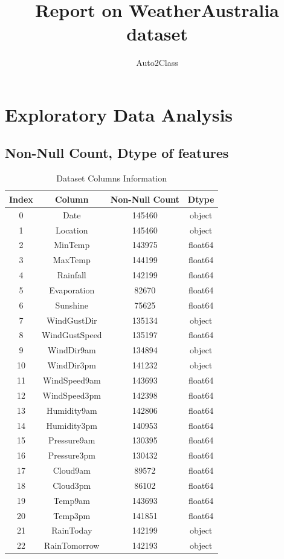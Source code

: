 \documentclass{article}%
\title{Report on WeatherAustralia dataset}%
\author{Auto2Class}%
\begin{document}
%
\normalsize%
\maketitle%
\newpage%
\tableofcontents%
\newpage%
\section{Exploratory Data Analysis}%
\label{sec:ExploratoryDataAnalysis}%
\subsection{Non{-}Null Count, Dtype of features}%
\label{subsec:Non{-}NullCount,Dtypeoffeatures}%


\begin{table}[h!]%
\caption{Dataset Columns Information}%
\vspace{0.2cm}%
\centering%
\begin{tabular}{|c||c||c||c|}%
\hline%
Index&Column&Non{-}Null Count&Dtype\\%
\hline%
0&Date&145460&object\\%
1&Location&145460&object\\%
2&MinTemp&143975&float64\\%
3&MaxTemp&144199&float64\\%
4&Rainfall&142199&float64\\%
5&Evaporation&82670&float64\\%
6&Sunshine&75625&float64\\%
7&WindGustDir&135134&object\\%
8&WindGustSpeed&135197&float64\\%
9&WindDir9am&134894&object\\%
10&WindDir3pm&141232&object\\%
11&WindSpeed9am&143693&float64\\%
12&WindSpeed3pm&142398&float64\\%
13&Humidity9am&142806&float64\\%
14&Humidity3pm&140953&float64\\%
15&Pressure9am&130395&float64\\%
16&Pressure3pm&130432&float64\\%
17&Cloud9am&89572&float64\\%
18&Cloud3pm&86102&float64\\%
19&Temp9am&143693&float64\\%
20&Temp3pm&141851&float64\\%
21&RainToday&142199&object\\%
22&RainTomorrow&142193&object\\%
\hline%
\end{tabular}%
\end{table}
\end{document}
